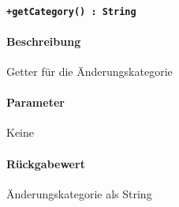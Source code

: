 \paragraph{\texttt{+getCategory() : String}}%
\paragraph*{Beschreibung}
Getter für die Änderungskategorie
\paragraph*{Parameter}
Keine
\paragraph*{Rückgabewert}
Änderungskategorie als String